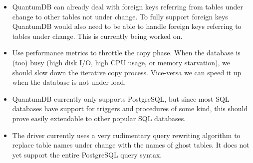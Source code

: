 \documentclass[conference]{IEEEtran}
\begin{document}
\begin{itemize}
  \item{QuantumDB can already deal with foreign keys referring from tables under change to other tables not under change. To fully support foreign keys QuantumDB would also need to be able to handle foreign keys referring to tables under change. This is currently being worked on.}
  \item{Use performance metrics to throttle the copy phase. When the database is (too) busy (high disk I/O, high CPU usage, or memory starvation), we should slow down the iterative copy process. Vice-versa we can speed it up when the database is not under load.}
  \item{QuantumDB currently only supports PostgreSQL, but since most SQL databases have support for triggers and procedures of some kind, this should prove easily extendable to other popular SQL databases.}
  \item{The driver currently uses a very rudimentary query rewriting algorithm to replace table names under change with the names of ghost tables. It does not yet support the entire PostgreSQL query syntax.}
\end{itemize}



%
%

\end{document}
